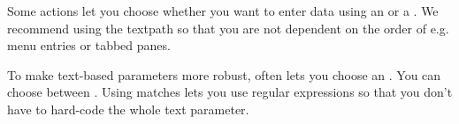 Some actions let you choose whether you want to enter data using an  or a . We recommend using the textpath so that you are not dependent on the order of e.g. menu entries or tabbed panes. 

To make text-based parameters more robust, \app{} often lets you choose an . You can choose between . Using matches lets you use regular expressions so that you don't have to hard-code the whole text parameter. 




